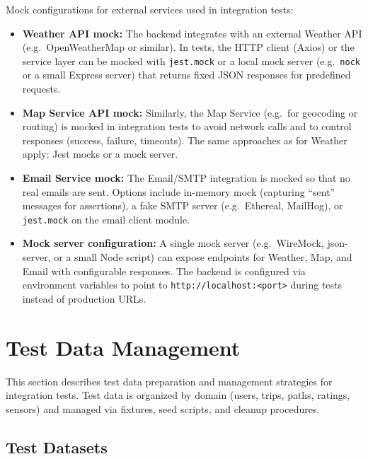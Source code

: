 Mock configurations for external services used in integration tests:
\begin{itemize}
    \item \textbf{Weather API mock:} The backend integrates with an external Weather API (e.g.\ OpenWeatherMap or similar). In tests, the HTTP client (Axios) or the service layer can be mocked with \texttt{jest.mock} or a local mock server (e.g.\ \texttt{nock} or a small Express server) that returns fixed JSON responses for predefined requests.
    \item \textbf{Map Service API mock:} Similarly, the Map Service (e.g.\ for geocoding or routing) is mocked in integration tests to avoid network calls and to control responses (success, failure, timeouts). The same approaches as for Weather apply: Jest mocks or a mock server.
    \item \textbf{Email Service mock:} The Email/SMTP integration is mocked so that no real emails are sent. Options include in-memory mock (capturing “sent” messages for assertions), a fake SMTP server (e.g.\ Ethereal, MailHog), or \texttt{jest.mock} on the email client module.
    \item \textbf{Mock server configuration:} A single mock server (e.g.\ WireMock, json-server, or a small Node script) can expose endpoints for Weather, Map, and Email with configurable responses. The backend is configured via environment variables to point to \texttt{http://localhost:<port>} during tests instead of production URLs.
\end{itemize}

\section{Test Data Management}
\label{sec:test_data_management}%

This section describes test data preparation and management strategies for integration tests. Test data is organized by domain (users, trips, paths, ratings, sensors) and managed via fixtures, seed scripts, and cleanup procedures.

\subsection{Test Datasets}
\label{subsec:test_datasets}%

